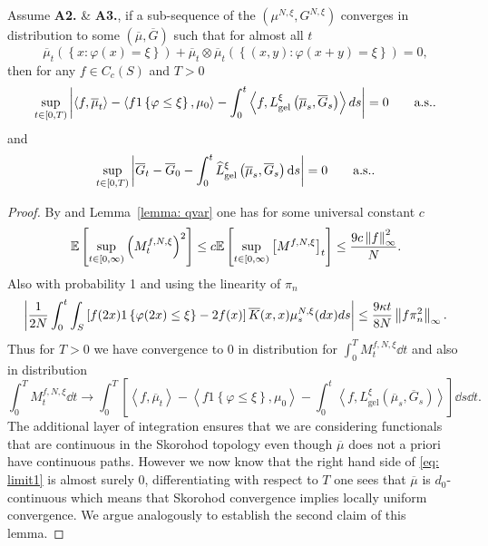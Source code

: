 \begin{lemma}\label{lem: mild}
Assume \textbf{A2.} \& \textbf{A3.}, if a sub-sequence of the $\left(\mu^{N,\xi}, G^{N,\xi}\right)$ converges in distribution to some $\left(\overline{\mu}, \overline{G}\right)$ such that for almost all $t$
\begin{equation*}
  \overline{\mu}_t\left(\left\{x\colon \varphi(x) = \xi\right\}\right) + 
  \overline{\mu}_t \otimes \overline{\mu}_t \left(\left\{(x,y) \colon \varphi(x+y) = \xi\right\}\right) = 0,
\end{equation*}
then for any $f\in C_c(S)$ and $T> 0$
\begin{equation*}
    \sup_{t\in[0,T)} \left\lvert{\left<f, \overline{\mu}_t\right> - \left<f1\left\{\varphi \leq \xi\right\}, \mu_0\right> - \int_0^t \left<f, L^\xi_\mathrm{gel}\left(\overline{\mu}_s, \overline{G}_s\right) \right> ds}\right\rvert = 0
    \qquad \text{a.s.}.
\end{equation*}
and
\begin{equation*}
    \sup_{t\in[0,T)} \left\lvert{\overline{G}_t - \overline{G}_0 - \int_0^t \widehat{L}^\xi_\mathrm{gel}\left(\overline{\mu}_s, \overline{G}_s\right) \ensuremath{\mathrm{d}}s}\right\rvert = 0
    \qquad \text{a.s.}.
\end{equation*}
\end{lemma}
\begin{proof}
By \cite[Thrm. 26.12]{K02} and Lemma~\ref{lemma: qvar} one has for some universal constant $c$
\begin{equation*}
    \mathbb{E}\left[\sup_{t\in[0,\infty)} \left(M_t^{f,N,\xi}\right)^2\right]
    \leq c \mathbb{E}\left[\sup_{t\in[0,\infty)} \left[M^{f,N,\xi}\right]_t\right]
    \leq \frac{9c \left\lVert{f}\right\rVert_\infty^2}{N}.
\end{equation*}
Also with probability 1 and using the linearity of $\pi_n$
\begin{equation*}
   \left\lvert{\frac{1}{2N}\int_0^t \int_S \left[f(2x)1\left\{\varphi(2x)\leq \xi\right\} - 2f(x)\right]\overline{K}(x,x)\mu^{N,\xi}_s(d x) d s}\right\rvert
   \leq \frac{9\kappa t}{8N}\left\lVert{f\pi_n^2}\right\rVert_\infty.
\end{equation*}
Thus for $T> 0$ we have convergence to 0 in distribution for $\int_0^T M^{f,N,\xi}_t \dd t$ and also in distribution
\begin{equation}\label{eq: limit1}
\int_0^T M^{f,N,\xi}_t \dd t \rightarrow
     \int_0^T \left[ \left<f,\overline{\mu}_t\right> -\left<f1\left\{\varphi \leq \xi\right\},\mu_0\right> - \int_0^t \left<f, L^\xi_\mathrm{gel}(\overline{\mu}_s, \overline{G}_s)\right>\right] \dd s \dd t.
\end{equation}
The additional layer of integration ensures that we are considering functionals that are continuous in the Skorohod topology even though $\overline{\mu}$ does not a priori have continuous paths.
However we now know that the right hand side of \eqref{eq: limit1} is almost surely 0, differentiating with respect to $T$ one sees that $\overline{\mu}$ is $d_0$-continuous which means that Skorohod convergence implies locally uniform convergence.
We argue analogously to establish the second claim of this lemma.
\end{proof}

